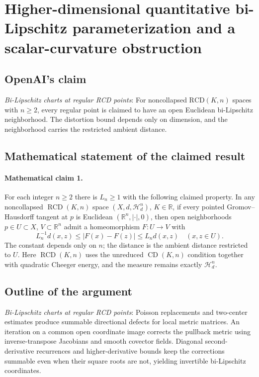 \documentclass[11pt]{article}
\begin{document}
\section*{Higher-dimensional quantitative bi-Lipschitz parameterization and a scalar-curvature obstruction}

\subsection{OpenAI's claim}
\textit{Bi-Lipschitz charts at regular RCD points}: For noncollapsed $\mathrm{RCD}(K,n)$ spaces with $n\ge2$, every regular point is claimed to have an open Euclidean bi-Lipschitz neighborhood. The distortion bound depends only on dimension, and the neighborhood carries the restricted ambient distance.

\subsection{Mathematical statement of the claimed result}
\paragraph{Mathematical claim 1.} For each integer $n\ge2$ there is $L_n\ge1$ with the following claimed property. In any noncollapsed $\operatorname{RCD}(K,n)$ space $(X,d,\mathcal H_d^n)$, $K\in\mathbb R$, if every pointed Gromov--Hausdorff tangent at $p$ is Euclidean $(\mathbb R^n,|\cdot|,0)$, then open neighborhoods $p\in U\subset X$, $V\subset\mathbb R^n$ admit a homeomorphism $F:U\to V$ with \[L_n^{-1}d(x,z)\le|F(x)-F(z)|\le L_nd(x,z)\quad(x,z\in U).\] The constant depends only on $n$; the distance is the ambient distance restricted to $U$. Here $\operatorname{RCD}(K,n)$ uses the unreduced $\operatorname{CD}(K,n)$ condition together with quadratic Cheeger energy, and the measure remains exactly $\mathcal H_d^n$.

\subsection{Outline of the argument}
\textit{Bi-Lipschitz charts at regular RCD points}: Poisson replacements and two-center estimates produce summable directional defects for local metric matrices. An iteration on a common open coordinate image corrects the pullback metric using inverse-transpose Jacobians and smooth covector fields. Diagonal second-derivative recurrences and higher-derivative bounds keep the corrections summable even when their square roots are not, yielding invertible bi-Lipschitz coordinates.
\end{document}
